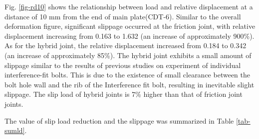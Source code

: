 Fig. \ref{fig-rd10} shows the relationship between load and relative displacement at a distance of 10 mm from the end of main plate(CDT-6). Similar to the overall deformation figure, significant slippage occurred at the friction joint, with relative displacement increasing from 0.163 to 1.632 (an increase of approximately 900\%). As for the hybrid joint, the relative displacement increased from 0.184 to 0.342 (an increase of approximately 85\%). The hybrid joint exhibits a small amount of slippage similar to the results of previous studies\cite{kamei2010} on experiment of individual interference-fit bolts. This is due to the existence of small clearance between the bolt hole wall and the rib of the Interference fit bolt, resulting in inevitable slight slippage. The slip load of hybrid joints is 7\% higher than that of friction joint joints.

The value of slip load reduction and the slippage was summarized in Table \ref{tab-sumld}.


